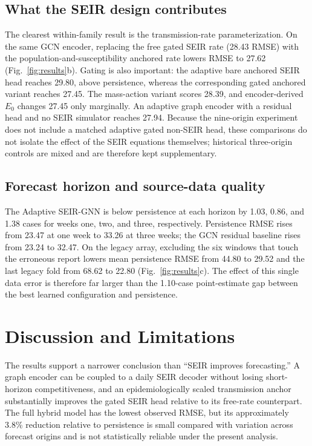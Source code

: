 \documentclass[conference]{IEEEtran}
\begin{document}
\subsection{What the SEIR design contributes}
The clearest within-family result is the transmission-rate parameterization.
On the same GCN encoder, replacing the free gated SEIR rate (28.43 RMSE) with the population-and-susceptibility anchored rate lowers RMSE to 27.62 (Fig.~\ref{fig:results}b). %
Gating is also important: the adaptive bare anchored SEIR head reaches 29.80, above persistence, whereas the corresponding gated anchored variant reaches 27.45. %
The mass-action variant scores 28.39, and encoder-derived $E_0$ changes 27.45 only marginally. %
An adaptive graph encoder with a residual head and no SEIR simulator reaches 27.94. %
Because the nine-origin experiment does not include a matched adaptive gated non-SEIR head, these comparisons do not isolate the effect of the SEIR equations themselves; historical three-origin controls are mixed and are therefore kept supplementary.

\subsection{Forecast horizon and source-data quality}
The Adaptive SEIR-GNN is below persistence at each horizon by 1.03, 0.86, and 1.38 cases for weeks one, two, and three, respectively. %
Persistence RMSE rises from 23.47 at one week to 33.26 at three weeks; the GCN residual baseline rises from 23.24 to 32.47. %
On the legacy array, excluding the six windows that touch the erroneous report lowers mean persistence RMSE from 44.80 to 29.52 and the last legacy fold from 68.62 to 22.80 (Fig.~\ref{fig:results}c). %
The effect of this single data error is therefore far larger than the 1.10-case point-estimate gap between the best learned configuration and persistence. %

\section{Discussion and Limitations}\label{sec:discussion}
The results support a narrower conclusion than ``SEIR improves forecasting.''
A graph encoder can be coupled to a daily SEIR decoder without losing short-horizon competitiveness, and an epidemiologically scaled transmission anchor substantially improves the gated SEIR head relative to its free-rate counterpart.
The full hybrid model has the lowest observed RMSE, but its approximately 3.8\% reduction relative to persistence is small compared with variation across forecast origins and is not statistically reliable under the present analysis.
\end{document}
